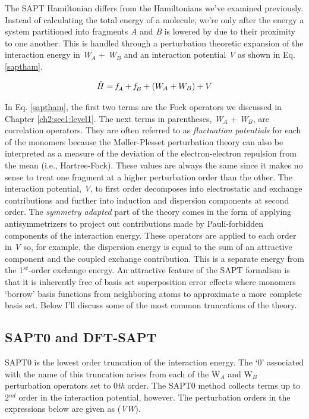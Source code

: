 \begin{theory}
  The SAPT Hamiltonian differs from the Hamiltonians we've examined previously. Instead of calculating the total
  energy of a molecule, we're only after the energy a system partitioned into fragments \emph{A} and \emph{B} is 
  lowered by due to their proximity to one another. This is handled through a perturbation theoretic expansion
  of the interaction energy in \emph{W}$_{A}$ + \emph{W}$_{B}$ and an interaction potential \emph{V} as shown in
  Eq. \ref{saptham}.
  
  \begin{equation}\label{saptham}
      \hat{H} = \emph{f}_{A} + \emph{f}_{B} + \left(W_{A} + W_{B}\right) + V
  \end{equation}
  
  In Eq. \ref{saptham}, the first two terms are the Fock operators we discussed in Chapter \ref{ch2:sec1:level1}.
  The next terms in parentheses, \emph{W}$_{A}$ + \emph{W}$_{B}$, are correlation operators. They are often 
  referred to as \emph{fluctuation potentials} for each of the monomers because the M$\text{\o}$ller-Plesset perturbation
  theory can also be interpreted as a measure of the deviation of the electron-electron repulsion from the mean
  (i.e., Hartree-Fock). These values are always the same since it makes no sense to treat one fragment at a higher
  perturbation order than the other. The interaction potential, \emph{V}, to first order decomposes into 
  electrostatic and exchange contributions and further into induction and dispersion components at second order.
  The \emph{symmetry adapted} part of the theory comes in the form of applying antisymmetrizers to project out 
  contributions made by Pauli-forbidden components of the interaction energy. These operators are applied to each 
  order in \emph{V} so, for example, the dispersion energy is equal to the sum of an attractive component and the 
  coupled exchange contribution. This is a separate energy from the 1$^{st}$-order exchange energy. An attractive
  feature of the SAPT formalism is that it is inherently free of basis set superposition error effects where 
  monomers `borrow' basis functions from neighboring atoms to approximate a more complete basis set. Below I'll 
  discuss some of the most common truncations of the theory.
  
  \subsection{\label{ch2:sec2:level2}SAPT0 and DFT-SAPT}
  SAPT0 is the lowest order truncation of the interaction energy. The `0' associated with the name of this truncation
  arises from each of the W$_{A}$ and W$_{B}$ perturbation operators set to 0\emph{th} order. The SAPT0 method 
  collects terms up to 2$^{nd}$ order in the interaction potential, however. The perturbation orders in the 
  expressions below are given as (\emph{V}\emph{W}).
  

\end{theory}
